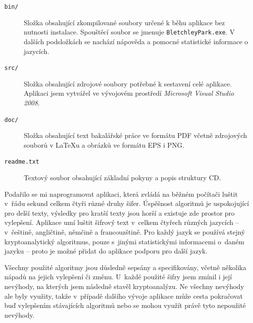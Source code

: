 \documentclass[12pt]{article}
\theoremstyle{definition}
\begin{document}
\begin{description}
\item[\texttt{bin/}] Složka obsahující zkompilované soubory určené k běhu aplikace bez nutnosti instalace. Spouštěcí soubor se jmenuje \texttt{BletchleyPark.exe}. V dalších podsložkách se nachází nápověda a pomocné statistické informace o jazycích. 

\item[\texttt{src/}] Složka obsahující zdrojové soubory potřebné k sestavení celé aplikace. Aplikaci jsem vytvářel ve vývojovém prostředí {\em Microsoft Visual Studio 2008}.%

\item[\texttt{doc/}] Složka obsahující text bakalářské práce ve formátu PDF včetně zdrojových souborů v \LaTeX u a obrázků ve formátu EPS i PNG. 

\item[\texttt{readme.txt}] Textový soubor obsahující základní pokyny a popis struktury CD. 
\end{description}










\begin{conclusions-cz}
Podařilo se mi naprogramovat aplikaci, která zvládá na běžném počítači luštit v~řádu sekund celkem čtyři různé druhy šifer. Úspěšnost algoritmů je uspokojující pro delší texty, výsledky pro kratší texty jsou horší a existuje zde prostor pro vylepšení. Aplikace umí luštit šifrový text v~celkem čtyřech různých jazycích -- v~češtině, angličtině, němčině a francouzštině. Pro každý jazyk se používá stejný kryptoanalytický algoritmus, pouze s~jinými statistickými informacemi o~daném jazyku -- proto je možné přidat do aplikace podporu pro další jazyk.

Všechny použité algoritmy jsou důsledně sepsány a specifikovány, včetně několika nápadů na jejich vylepšení či změnu. U~každé použité šifry jsem zmínil i její nevýhody, na kterých jsem následně stavěl kryptoanalýzu. Ne všechny nevýhody ale byly využity, takže v~případě dalšího vývoje aplikace může cesta pokračovat buď vylepšením stávajících algoritmů nebo se mohou využít právě tyto nepoužité nevýhody.
\end{conclusions-cz}
















\newpage

%

\end{document}
